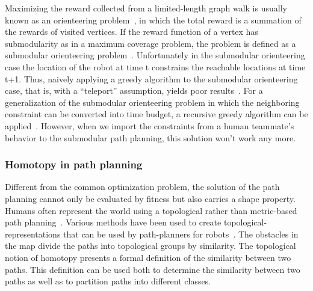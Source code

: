 \documentclass[phd]{byuprop}
\begin{document}
Maximizing the reward collected from a limited-length graph walk is usually known as an orienteering problem~\cite{Vansteenwegen2011}, in which the total reward is a summation of the rewards of visited vertices. 
If the reward function of a vertex has submodularity as in a maximum coverage problem, the problem is defined as a submodular orienteering problem~\cite{Chekuri2005}. 
Unfortunately in the submodular orienteering case the location of the robot at time t constrains the reachable locations at time t+1.
Thus, naively applying a greedy algorithm to the submodular orienteering case, that is, with a “teleport” assumption, yields poor results~\cite{Krause2012}. 
For a generalization of the submodular orienteering problem in which the neighboring constraint can be converted into time budget, a recursive greedy algorithm can be applied~\cite{Chekuri2005}.
However, when we import the constraints from a human teammate's behavior to the submodular path planning, this solution won't work any more. 

\subsubsection{Homotopy in path planning}

Different from the common optimization problem, the solution of the path planning cannot only be evaluated by fitness but also carries a shape property.
Humans often represent the world using a topological rather than metric-based path planning~\cite{Aginsky1997,kuipers1999}. 
Various methods have been used to create topological-representations that can be used by path-planners for robots~\cite{Mataric1992,Thrun1998,Fasola2013,Shah2013}.
The obstacles in the map divide the paths into topological groups by similarity. 
The topological notion of homotopy presents a formal definition of the similarity between two paths. 
This definition can be used both to determine the similarity between two paths as well as to partition paths into different classes.
\end{document}
